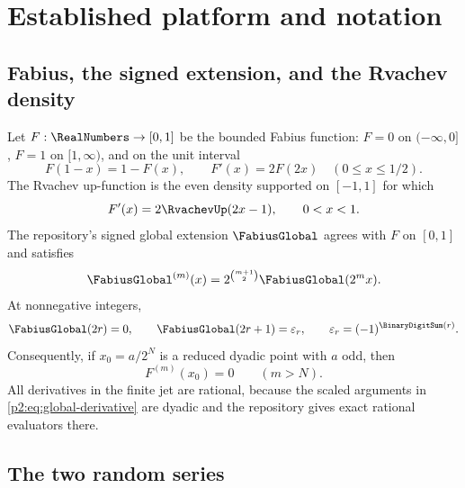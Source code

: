 \documentclass[11pt,oneside]{article}
\numberwithin{equation}{section}
\theoremstyle{definition}
\theoremstyle{remark}
\newcommand{\eps}{\varepsilon}
\begin{document}
\section{Established platform and notation}
\label{p2:sec:platform}

\subsection{Fabius, the signed extension, and the Rvachev density}

Let $F:\RealNumbers\to[0,1]$ be the bounded Fabius function: $F=0$ on $(-\infty,0]$,
$F=1$ on $[1,\infty)$, and on the unit interval
\begin{equation}
 F(1-x)=1-F(x),\qquad F'(x)=2F(2x)\quad(0\le x\le1/2).
 \label{p2:eq:F-basic}
\end{equation}
The Rvachev up-function is the even density supported on $[-1,1]$ for which
\begin{equation}
 F'(x)=2\RvachevUp(2x-1),\qquad 0<x<1.
 \label{p2:eq:Fprime-up}
\end{equation}
The repository's signed global extension $\FabiusGlobal$ agrees with $F$ on $[0,1]$ and satisfies
\begin{equation}
 \FabiusGlobal^{(m)}(x)=2^{\binom{m+1}{2}}\FabiusGlobal(2^m x).
 \label{p2:eq:global-derivative}
\end{equation}
At nonnegative integers,
\begin{equation}
 \FabiusGlobal(2r)=0,\qquad \FabiusGlobal(2r+1)=\eps_r,
 \qquad \eps_r=(-1)^{\BinaryDigitSum(r)}.
 \label{p2:eq:integer-global}
\end{equation}
Consequently, if $x_0=a/2^N$ is a reduced dyadic point with $a$ odd, then
\begin{equation}
 F^{(m)}(x_0)=0\qquad(m>N).
 \label{p2:eq:dyadic-vanish}
\end{equation}
All derivatives in the finite jet are rational, because the scaled arguments in
\eqref{p2:eq:global-derivative} are dyadic and the repository gives exact rational evaluators there.

\subsection{The two random series}
\end{document}
